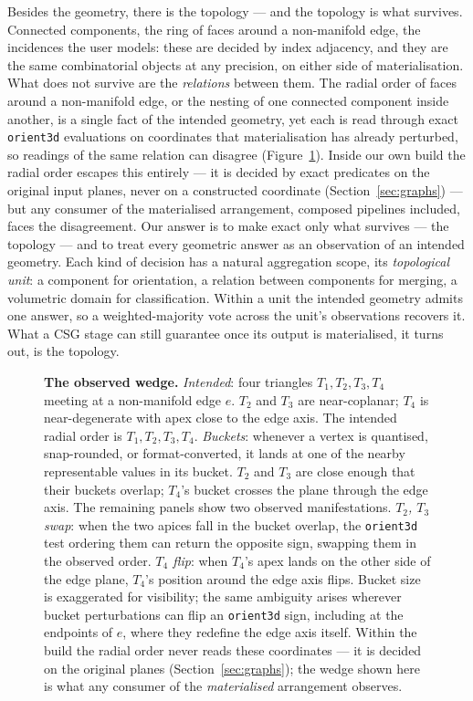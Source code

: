 \documentclass{egpubl}
\begin{document}
Besides the geometry, there is the topology --- and the topology is what survives. Connected components, the ring of faces around a non-manifold edge, the incidences the user models: these are decided by index adjacency, and they are the same combinatorial objects at any precision, on either side of materialisation. What does not survive are the \emph{relations} between them. The radial order of faces around a non-manifold edge, or the nesting of one connected component inside another, is a single fact of the intended geometry, yet each is read through exact \texttt{orient3d} evaluations on coordinates that materialisation has already perturbed, so readings of the same relation can disagree (Figure~\ref{fig:observed_wedge}). Inside our own build the radial order escapes this entirely --- it is decided by exact predicates on the original input planes, never on a constructed coordinate (Section~\ref{sec:graphs}) --- but any consumer of the materialised arrangement, composed pipelines included, faces the disagreement. Our answer is to make exact only what survives --- the topology --- and to treat every geometric answer as an observation of an intended geometry. Each kind of decision has a natural aggregation scope, its \emph{topological unit}: a component for orientation, a relation between components for merging, a volumetric domain for classification. Within a unit the intended geometry admits one answer, so a weighted-majority vote across the unit's observations recovers it. What a CSG stage can still guarantee once its output is materialised, it turns out, is the topology.

\begin{figure}[t]
  \centering
  
  \caption{\textbf{The observed wedge.} \emph{Intended}: four triangles $T_1, T_2, T_3, T_4$ meeting at a non-manifold edge $e$. $T_2$ and $T_3$ are near-coplanar; $T_4$ is near-degenerate with apex close to the edge axis. The intended radial order is $T_1, T_2, T_3, T_4$. \emph{Buckets}: whenever a vertex is quantised, snap-rounded, or format-converted, it lands at one of the nearby representable values in its bucket. $T_2$ and $T_3$ are close enough that their buckets overlap; $T_4$'s bucket crosses the plane through the edge axis. The remaining panels show two observed manifestations. \emph{$T_2$, $T_3$ swap}: when the two apices fall in the bucket overlap, the \texttt{orient3d} test ordering them can return the opposite sign, swapping them in the observed order. \emph{$T_4$ flip}: when $T_4$'s apex lands on the other side of the edge plane, $T_4$'s position around the edge axis flips. Bucket size is exaggerated for visibility; the same ambiguity arises wherever bucket perturbations can flip an \texttt{orient3d} sign, including at the endpoints of $e$, where they redefine the edge axis itself. Within the build the radial order never reads these coordinates --- it is decided on the original planes (Section~\ref{sec:graphs}); the wedge shown here is what any consumer of the \emph{materialised} arrangement observes.}
  \label{fig:observed_wedge}
\end{figure}
\end{document}
